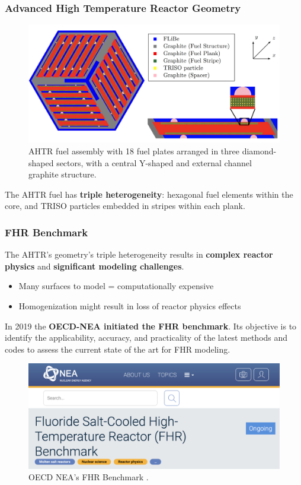     \begin{frame}
    \frametitle{Advanced High Temperature Reactor Geometry}
    \begin{figure}[]
        \includegraphics[width=\linewidth]{figures/ahtr-assembly.png} 
        \caption{AHTR fuel assembly with 18 fuel plates arranged in 
        three diamond-shaped sectors, with a central Y-shaped and external channel 
        graphite structure.}
    \end{figure}
    \pause
    \vspace{-0.2cm}
    The AHTR fuel has \textbf{triple heterogeneity}: hexagonal fuel elements within the 
    core, and TRISO particles embedded in stripes within each plank.
    \end{frame}

    \begin{frame}
    \frametitle{FHR Benchmark}
    The AHTR's geometry's triple heterogeneity results in
    \textbf{complex reactor physics} and \textbf{significant modeling challenges}.
    \begin{itemize}
        \item Many surfaces to model = computationally expensive 
        \item Homogenization might result in loss of reactor physics effects 
    \end{itemize}
    \pause
    \vspace{0.3cm}
    In 2019 the \textbf{OECD-NEA initiated the FHR benchmark}. Its objective 
    is to identify the applicability, accuracy, and practicality of the latest 
    methods and codes to assess the current state of the art for FHR modeling.

    \vspace{0.2cm}
    \begin{figure}[]
        \includegraphics[width=0.7\linewidth]{figures/benchmark.png} 
        \caption{OECD NEA's FHR Benchmark \cite{petrovic_benchmark_2021}.}
    \end{figure}
    \end{frame}

